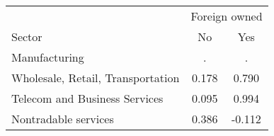 \begin{tabular}{lcc}
\toprule
 & \multicolumn{2}{c}{Foreign owned} \\
\cmidrule(lr){2-3}
Sector & No & Yes \\
\midrule
Manufacturing & . & . \\
Wholesale, Retail, Transportation & 0.178 & 0.790 \\
Telecom and Business Services & 0.095 & 0.994 \\
Nontradable services & 0.386 & -0.112 \\
\bottomrule
\end{tabular}
